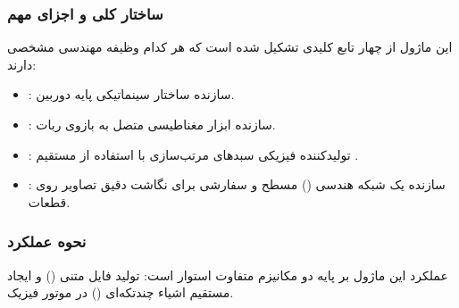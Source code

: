 \documentclass{article}
\begin{document}
\subsubsection{ساختار کلی و اجزای مهم}
این ماژول از چهار تابع کلیدی تشکیل شده است که هر کدام وظیفه مهندسی مشخصی دارند:

\begin{itemize}
	\item {}: سازنده ساختار سینماتیکی پایه دوربین.
	\item {}: سازنده ابزار مغناطیسی متصل به بازوی ربات.
	\item {}: تولیدکننده فیزیکی سبدهای مرتب‌سازی با استفاده از  مستقیم .
	\item {}: سازنده یک شبکه هندسی () مسطح و سفارشی برای نگاشت دقیق تصاویر روی قطعات.
\end{itemize}

\subsubsection{نحوه عملکرد}
عملکرد این ماژول بر پایه دو مکانیزم متفاوت استوار است: تولید فایل متنی () و ایجاد مستقیم اشیاء چندتکه‌ای () در موتور فیزیک.
\end{document}
